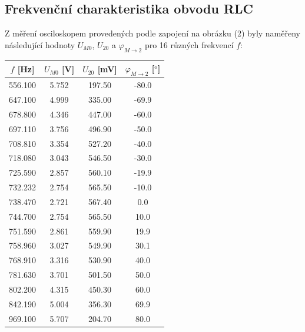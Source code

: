 \documentclass[a4paper,11pt]{article}
\begin{document}
\begin{minipage}[t]{0.5\textwidth}
             \subsection{Frekvenční charakteristika obvodu RLC}
                Z měření osciloskopem provedených podle zapojení na obrázku (2) byly naměřeny následující hodnoty $U_{M0}$, $U_{20}$ a $\varphi_{M\rightarrow 2}$ pro 16 různých frekvencí $f$: 
                \vspace{10pt}
                \par \centering
                \begin{tabular}{|c|c|c|c|}
                    \hline
                    $f$ [Hz] & $U_{M0}$ [V] & $U_{20}$ [mV] & $\varphi_{M\rightarrow 2}$ [$^o$] \\
                    \hline
                    556.100 & 5.752 & 197.50 & -80.0 \\
                    \hline
                    647.100 & 4.999 & 335.00 & -69.9 \\
                    \hline
                    678.800 & 4.346 & 447.00 & -60.0 \\
                    \hline
                    697.110 & 3.756 & 496.90 & -50.0 \\
                    \hline
                    708.810 & 3.354 & 527.20 & -40.0 \\
                    \hline
                    718.080 & 3.043 & 546.50 & -30.0 \\
                    \hline
                    725.590 & 2.857 & 560.10 & -19.9 \\
                    \hline
                    732.232 & 2.754 & 565.50 & -10.0 \\
                    \hline
                    738.470 & 2.721 & 567.40 & 0.0 \\
                    \hline
                    744.700 & 2.754 & 565.50 & 10.0 \\
                    \hline
                    751.590 & 2.861 & 559.90 & 19.9 \\
                    \hline
                    758.960 & 3.027 & 549.90 & 30.1 \\
                    \hline
                    768.910 & 3.316 & 530.90 & 40.0 \\
                    \hline
                    781.630 & 3.701 & 501.50 & 50.0 \\
                    \hline
                    802.200 & 4.315 & 450.30 & 60.0 \\
                    \hline
                    842.190 & 5.004 & 356.30 & 69.9 \\
                    \hline
                    969.100 & 5.707 & 204.70 & 80.0 \\
                    \hline
                \end{tabular}
                \captionsetup{justification=centering, font=footnotesize}
                \vspace{20pt}
                \raggedright
\end{minipage}
\end{document}
